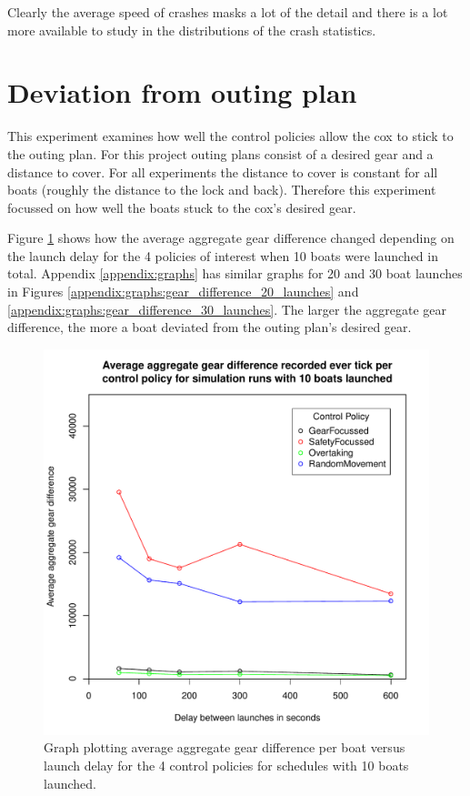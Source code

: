  Clearly the average speed of crashes masks a lot of the detail and there is a lot more available to study in the distributions of the crash statistics.
  
\section{Deviation from outing plan}

This experiment examines how well the control policies allow the cox to stick to the outing plan. For this project outing plans consist of a desired gear and a distance to cover. For all experiments the distance to cover is constant for all boats (roughly the distance to the lock and back). Therefore this experiment focussed on how well the boats stuck to the cox's desired gear.

Figure \ref{experiments:fig:gear_difference_10_launches} shows how the average aggregate gear difference changed depending on the launch delay for the 4 policies of interest when 10 boats were launched in total. Appendix \ref{appendix:graphs} has similar graphs for 20 and 30 boat launches in Figures \ref{appendix:graphs:gear_difference_20_launches} and \ref{appendix:graphs:gear_difference_30_launches}. The larger the aggregate gear difference, the more a boat deviated from the outing plan's desired gear.

\begin{figure}
\begin{center}
  \includegraphics[scale=0.8]{"images/graphs/Average aggregate gear difference recorded ever tick per control policy for simulation runs with 10 boats launched"}
  \caption{Graph plotting average aggregate gear difference per boat versus launch delay for the 4 control policies for schedules with 10 boats launched.}
  \label{experiments:fig:gear_difference_10_launches}
\end{center}
\end{figure}

